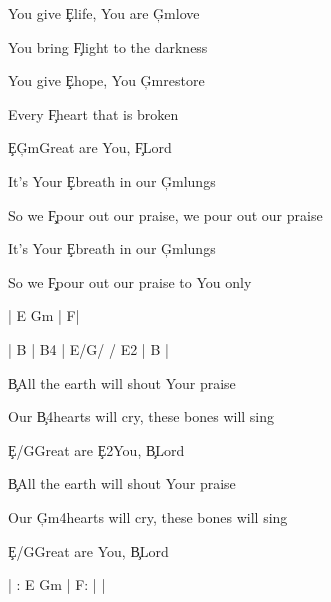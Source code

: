 \documentclass[9pt]{extarticle}
\begin{document}
\bsong

\bv
You give \c{E}life, You are \c{G\s m}love

You bring \c{F\s }light to the darkness

You give \c{E}hope, You \c{G\s m}restore

Every \c{F\s }heart that is broken

\c{E}\c{G\s m}Great are You, \c{F\s }Lord
\ev

\bc
It's Your \c{E}breath in our \c{G\s m}lungs

So we \c{F\s }pour out our praise, we pour out our praise

It's Your \c{E}breath in our \c{G\s m}lungs

So we \c{F\s }pour out our praise to You only
\ec

\bin
| E G\s m | F\s  |
\ein



\bin
| B | B4 |  E/G\s  / / E2  | B |
\ein

\bb[2]
\c{B}All the earth will shout Your praise

Our \c{B4}hearts will cry, these bones will sing

\c{E/G\s }Great are \c{E2}You, \c{B}Lord
\eb

\bb
\c{B}All the earth will shout Your praise

Our \c{G\s m4}hearts will cry, these bones will sing

\c{E/G\s }Great are You, \c{B}Lord
\eb


\bo
| : E G\s m | F\s  : |  |
\eo

\esong
\end{document}

